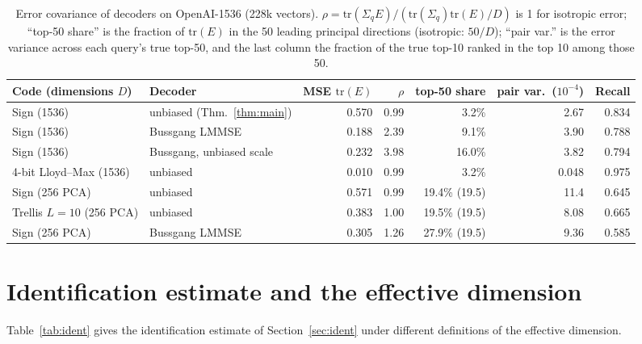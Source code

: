 \documentclass[10pt]{article}
\begin{document}
\begin{table}[!htbp]
\caption{Error covariance of decoders on OpenAI-1536 (228k vectors). $\rho=\mathrm{tr}(\Sigma_qE)/(\mathrm{tr}(\Sigma_q)\mathrm{tr}(E)/D)$ is 1 for isotropic error; ``top-50 share'' is the fraction of $\mathrm{tr}(E)$ in the 50 leading principal directions (isotropic: $50/D$); ``pair var.'' is the error variance across each query's true top-50, and the last column the fraction of the true top-10 ranked in the top 10 among those 50.}
\label{tab:iso}
\small
\setlength{\tabcolsep}{3.5pt}
\begin{tabular}{llrrrrr}
\toprule
Code (dimensions $D$) & Decoder & MSE $\mathrm{tr}(E)$ & $\rho$ & top-50 share & pair var.\ ($10^{-4}$) & Recall \\
\midrule
Sign (1536) & unbiased (Thm.~\ref{thm:main}) & 0.570 & 0.99 & 3.2\% & 2.67 & 0.834 \\
Sign (1536) & Bussgang LMMSE & 0.188 & 2.39 & 9.1\% & 3.90 & 0.788 \\
Sign (1536) & Bussgang, unbiased scale & 0.232 & 3.98 & 16.0\% & 3.82 & 0.794 \\
4-bit Lloyd--Max (1536) & unbiased & 0.010 & 0.99 & 3.2\% & 0.048 & 0.975 \\
Sign (256 PCA) & unbiased & 0.571 & 0.99 & 19.4\% (19.5) & 11.4 & 0.645 \\
Trellis $L{=}10$ (256 PCA) & unbiased & 0.383 & 1.00 & 19.5\% (19.5) & 8.08 & 0.665 \\
Sign (256 PCA) & Bussgang LMMSE & 0.305 & 1.26 & 27.9\% (19.5) & 9.36 & 0.585 \\
\bottomrule
\end{tabular}
\end{table}

\section{Identification estimate and the effective dimension}\label{sn:ident}
Table~\ref{tab:ident} gives the identification estimate of Section~\ref{sec:ident} under different definitions of the effective dimension.
\end{document}

